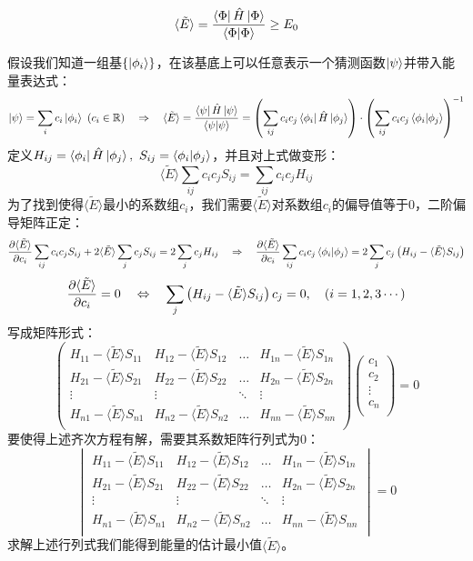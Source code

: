 \[\langle\tilde{E}\rangle=\frac{\bra{\Phi}\hat{H}\ket{\Phi}}{\bra{\Phi}\ket{\Phi}} \geq E_0\]

假设我们知道一组基$\{\ket{\phi_i}\}$，在该基底上可以任意表示一个猜测函数$\ket{\psi}$并带入能量表达式：
\[\ket{\psi}=\sum_ic_i\ket{\phi_i} \ (c_i\in\mathbb{R}) \quad \Rightarrow \quad \langle\tilde{E}\rangle=\frac{\bra{\psi}\hat{H}\ket{\psi}}{\bra{\psi}\ket{\psi}}=\left(\sum_{ij}c_ic_j\bra{\phi_i}\hat{H}\ket{\phi_j}\right)\cdot\left(\sum_{ij}c_ic_j\bra{\phi_i}\ket{\phi_j}\right)^{-1}\]
定义$H_{ij}=\bra{\phi_i}\hat{H}\ket{\phi_j}, \ S_{ij}=\bra{\phi_i}\ket{\phi_j}$，并且对上式做变形：
\[\langle\tilde{E}\rangle\sum_{ij}c_ic_jS_{ij}=\sum_{ij}c_ic_jH_{ij}\]
为了找到使得$\langle\tilde{E}\rangle$最小的系数组$c_i$，我们需要$\langle\tilde{E}\rangle$对系数组$c_i$的偏导值等于0，二阶偏导矩阵正定：
\[\pdv{\langle\tilde{E}\rangle}{c_i}\sum_{ij}c_ic_jS_{ij}+2\langle\tilde{E}\rangle\sum_{j}c_jS_{ij}=2\sum_{j}c_jH_{ij} \quad \Rightarrow \quad \pdv{\langle\tilde{E}\rangle}{c_i}\sum_{ij}c_ic_j\bra{\phi_i}\ket{\phi_j}=2\sum_{j}c_j\left(H_{ij}-\langle\tilde{E}\rangle S_{ij}\right)\]
\[\pdv{\langle\tilde{E}\rangle}{c_i}=0 \quad \Leftrightarrow \quad \sum_{j}\left(H_{ij}-\langle\tilde{E}\rangle S_{ij}\right)c_j=0, \quad (i=1,2,3 \cdots)\]
写成矩阵形式：
\[\begin{pmatrix}
H_{11}-\langle\tilde{E}\rangle S_{11} & H_{12}-\langle\tilde{E}\rangle S_{12} & \ldots & H_{1n}-\langle\tilde{E}\rangle S_{1n}\\
H_{21}-\langle\tilde{E}\rangle S_{21} & H_{22}-\langle\tilde{E}\rangle S_{22} & \ldots & H_{2n}-\langle\tilde{E}\rangle S_{2n}\\
\vdots & \vdots & \ddots & \vdots\\
H_{n1}-\langle\tilde{E}\rangle S_{n1} & H_{n2}-\langle\tilde{E}\rangle S_{n2} & \ldots & H_{nn}-\langle\tilde{E}\rangle S_{nn}\\
\end{pmatrix}
\begin{pmatrix}
c_1\\c_2\\\vdots\\c_n\\
\end{pmatrix}
=0\]
要使得上述齐次方程有解，需要其系数矩阵行列式为0：
\[\begin{vmatrix}
H_{11}-\langle\tilde{E}\rangle S_{11} & H_{12}-\langle\tilde{E}\rangle S_{12} & \ldots & H_{1n}-\langle\tilde{E}\rangle S_{1n}\\
H_{21}-\langle\tilde{E}\rangle S_{21} & H_{22}-\langle\tilde{E}\rangle S_{22} & \ldots & H_{2n}-\langle\tilde{E}\rangle S_{2n}\\
\vdots & \vdots & \ddots & \vdots\\
H_{n1}-\langle\tilde{E}\rangle S_{n1} & H_{n2}-\langle\tilde{E}\rangle S_{n2} & \ldots & H_{nn}-\langle\tilde{E}\rangle S_{nn}\\
\end{vmatrix}=0\]
求解上述行列式我们能得到能量的估计最小值$\langle\tilde{E}\rangle$。

